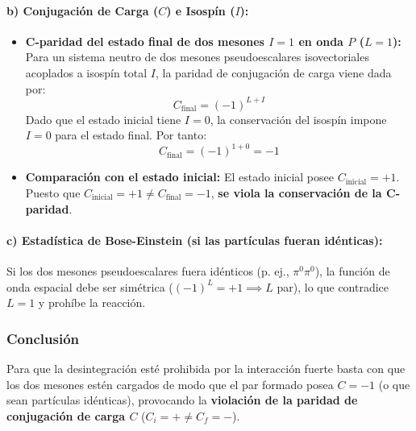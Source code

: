 \begin{problema}
\paragraph{b) Conjugación de Carga ($C$) e Isospín ($I$):}
\begin{itemize}
    \item \textbf{C-paridad del estado final de dos mesones $I=1$ en onda $P$ ($L=1$):}
    Para un sistema neutro de dos mesones pseudoescalares isovectoriales acoplados a isospín total $I$, la paridad de conjugación de carga viene dada por:
    \begin{equation*}
    C_{\text{final}} = (-1)^{L + I}
    \end{equation*}
    Dado que el estado inicial tiene $I = 0$, la conservación del isospín impone $I = 0$ para el estado final. Por tanto:
    \begin{equation*}
    C_{\text{final}} = (-1)^{1 + 0} = -1
    \end{equation*}
    \item \textbf{Comparación con el estado inicial:}
    El estado inicial posee $C_{\text{inicial}} = +1$. Puesto que $C_{\text{inicial}} = +1 \neq C_{\text{final}} = -1$, \textbf{se viola la conservación de la C-paridad}.
\end{itemize}

\paragraph{c) Estadística de Bose-Einstein (si las partículas fueran idénticas):}
Si los dos mesones pseudoescalares fuera idénticos (p. ej., $\pi^0 \pi^0$), la función de onda espacial debe ser simétrica ($(-1)^L = +1 \implies L$ par), lo que contradice $L=1$ y prohíbe la reacción.

\subsubsection*{Conclusión}
Para que la desintegración esté prohibida por la interacción fuerte basta con que los dos mesones estén cargados de modo que el par formado posea $C = -1$ (o que sean partículas idénticas), provocando la \textbf{violación de la paridad de conjugación de carga $C$} ($C_i = + \neq C_f = -$).
\end{problema}
\newpage

